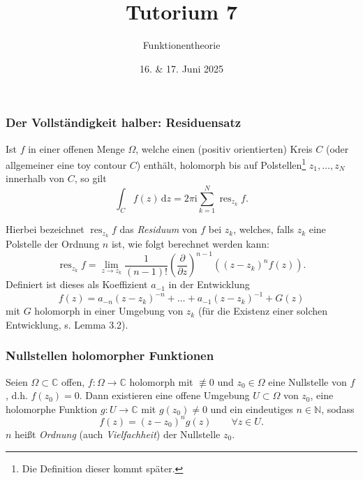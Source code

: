 \documentclass[10pt]{beamer}
\author[\url{https://fdf-uni.github.io/ft}]{}
\title{Tutorium 7}
\subtitle{\texorpdfstring{Funktionentheorie\vspace*{-1.5cm}}{Funktionentheorie}}
\date{16. \& 17. Juni 2025}
\newcommand{\iu}{\mathrm{i}}
\begin{document}
\begin{frame}
	\titlepage
\end{frame}
\begin{frame}
	\frametitle{Der Vollständigkeit halber: Residuensatz}
	\pause
	\begin{theorem}
		Ist $f$ in einer offenen Menge $\Omega$, welche einen (positiv orientierten) Kreis $C$ (oder allgemeiner eine toy contour $C$) enthält, holomorph bis auf Polstellen\footnote{Die Definition dieser kommt später.} $z_1, \dots, z_N$ innerhalb von $C$, so gilt
		\[
			\int_{C} f(z) \,\mathrm{d}z = 2 \pi \iu \sum_{k=1}^{N} \operatorname{res}_{z_k} f.
		\]
	\end{theorem}
	\pause
	Hierbei bezeichnet $\operatorname{res}_{z_k} f$ das \emph{Residuum} von $f$ bei $z_k$, welches, falls $z_k$ eine Polstelle der Ordnung $n$ ist, wie folgt berechnet werden kann:\vspace*{-0.15cm}
	\[
		\operatorname{res}_{z_k} f = \lim_{z \to z_k} \frac{1}{(n-1)!} \left( \frac{\partial}{\partial z} \right)^{n-1} ((z - z_k)^n f(z)).
	\]\vspace*{-0.15cm}
	\pause
	Definiert ist dieses als Koeffizient $a_{-1}$ in der Entwicklung
	\[
		f(z) = a_{-n} (z - z_k)^{-n} + \dots + a_{-1} (z - z_k)^{-1} + G(z)
	\]
	mit $G$ holomorph in einer Umgebung von $z_k$ (für die Existenz einer solchen Entwicklung, s. Lemma 3.2).
\end{frame}
\begin{frame}
	\frametitle{Nullstellen holomorpher Funktionen}
	Seien $\Omega \subset \mathbb{C}$ offen, $f \colon \Omega \to \mathbb{C}$ holomorph mit $\not\equiv 0$ und $z_0 \in \Omega$ eine Nullstelle von $f$, d.h. $f(z_0) = 0$.
	Dann existieren eine offene Umgebung $U \subset \Omega$ von $z_0$, eine holomorphe Funktion $g \colon U \to \mathbb{C}$ mit $g(z_0) \neq 0$ und ein eindeutiges $n \in \mathbb{N}$, sodass
	\[
		f(z) = (z - z_0)^n g(z) \qquad \forall z \in U.
	\]
	$n$ heißt \emph{Ordnung} (auch \emph{Vielfachheit}) der Nullstelle $z_0$.
\end{frame}
\end{document}

